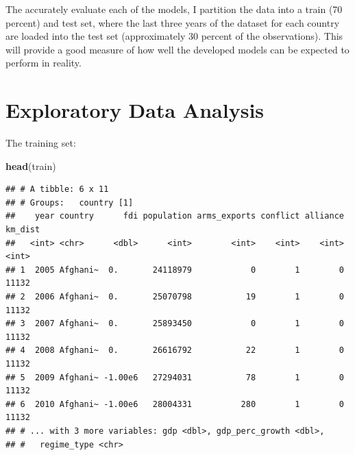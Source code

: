\documentclass[11pt,]{article}
\newenvironment{Shaded}{\begin{snugshade}}{\end{snugshade}}
\newcommand{\CharTok}[1]{\textcolor[rgb]{0.31,0.60,0.02}{#1}}
\newcommand{\CommentTok}[1]{\textcolor[rgb]{0.56,0.35,0.01}{\textit{#1}}}
\newcommand{\DataTypeTok}[1]{\textcolor[rgb]{0.13,0.29,0.53}{#1}}
\newcommand{\DecValTok}[1]{\textcolor[rgb]{0.00,0.00,0.81}{#1}}
\newcommand{\KeywordTok}[1]{\textcolor[rgb]{0.13,0.29,0.53}{\textbf{#1}}}
\newcommand{\NormalTok}[1]{#1}
\newcommand{\OperatorTok}[1]{\textcolor[rgb]{0.81,0.36,0.00}{\textbf{#1}}}
\newcommand{\OtherTok}[1]{\textcolor[rgb]{0.56,0.35,0.01}{#1}}
\newcommand{\StringTok}[1]{\textcolor[rgb]{0.31,0.60,0.02}{#1}}
\begin{document}
The accurately evaluate each of the models, I partition the data into a
train (70 percent) and test set, where the last three years of the
dataset for each country are loaded into the test set (approximately 30
percent of the observations). This will provide a good measure of how
well the developed models can be expected to perform in reality.

\begin{Shaded}
\end{Shaded}

\hypertarget{exploratory-data-analysis}{%
\section{Exploratory Data Analysis}\label{exploratory-data-analysis}}

The training set:

\begin{Shaded}
\begin{Highlighting}[]
\KeywordTok{head}\NormalTok{(train)}
\end{Highlighting}
\end{Shaded}

\begin{verbatim}
## # A tibble: 6 x 11
## # Groups:   country [1]
##    year country      fdi population arms_exports conflict alliance km_dist
##   <int> <chr>      <dbl>      <int>        <int>    <int>    <int>   <int>
## 1  2005 Afghani~  0.       24118979            0        1        0   11132
## 2  2006 Afghani~  0.       25070798           19        1        0   11132
## 3  2007 Afghani~  0.       25893450            0        1        0   11132
## 4  2008 Afghani~  0.       26616792           22        1        0   11132
## 5  2009 Afghani~ -1.00e6   27294031           78        1        0   11132
## 6  2010 Afghani~ -1.00e6   28004331          280        1        0   11132
## # ... with 3 more variables: gdp <dbl>, gdp_perc_growth <dbl>,
## #   regime_type <chr>
\end{verbatim}
\end{document}
